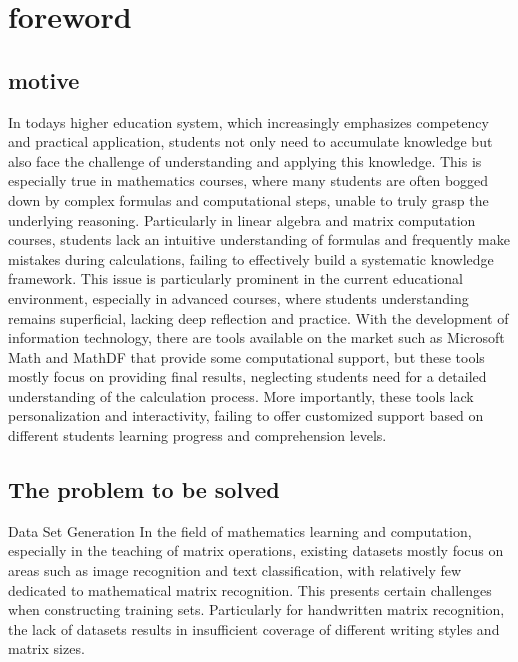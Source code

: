 \documentclass[
]{article}
\begin{document}
\section{foreword}\label{foreword}

\subsection{motive}\label{motive}

In today\textquotesingle s higher education system, which increasingly
emphasizes competency and practical application, students not only need
to accumulate knowledge but also face the challenge of understanding and
applying this knowledge. This is especially true in mathematics courses,
where many students are often bogged down by complex formulas and
computational steps, unable to truly grasp the underlying reasoning.
Particularly in linear algebra and matrix computation courses, students
lack an intuitive understanding of formulas and frequently make mistakes
during calculations, failing to effectively build a systematic knowledge
framework. This issue is particularly prominent in the current
educational environment, especially in advanced courses, where
students\textquotesingle{} understanding remains superficial, lacking
deep reflection and practice. With the development of information
technology, there are tools available on the market such as Microsoft
Math and MathDF that provide some computational support, but these tools
mostly focus on providing final results, neglecting students
\textquotesingle need for a detailed understanding of the calculation
process. More importantly, these tools lack personalization and
interactivity, failing to offer customized support based on different
students\textquotesingle{} learning progress and comprehension levels.

\subsection{The problem to be solved}\label{the-problem-to-be-solved}

Data Set Generation In the field of mathematics learning and
computation, especially in the teaching of matrix operations, existing
datasets mostly focus on areas such as image recognition and text
classification, with relatively few dedicated to mathematical matrix
recognition. This presents certain challenges when constructing training
sets. Particularly for handwritten matrix recognition, the lack of
datasets results in insufficient coverage of different writing styles
and matrix sizes.
\end{document}
